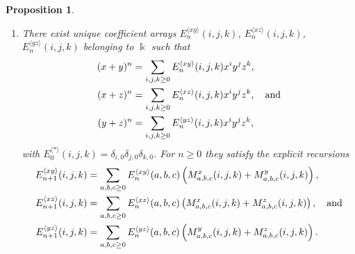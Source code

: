 \documentclass{amsart}
\newtheorem{proposition}[theorem]{Proposition}
\theoremstyle{definition}
\theoremstyle{remark}
\numberwithin{equation}{section}
\begin{document}
\begin{proposition}
\begin{enumerate}
\item [\rm (5)] There exist unique coefficient arrays $E^{\langle xy\rangle}_{n}(i,j,k)$, $E^{\langle xz\rangle}_{n}(i,j,k)$, $E^{\langle yz\rangle}_{n}(i,j,k)$ belonging to $\Bbbk$ such that
\begin{align}
(x+y)^n&=\sum_{i,j,k\ge 0}E^{\langle xy\rangle}_{n}(i,j,k) x^i y^j z^k,\label{Exydefcase5i}\\
(x+z)^n&=\sum_{i,j,k\ge 0}E^{\langle xz\rangle}_{n}(i,j,k) x^i y^j z^k,\label{Exzdefcase5i} \quad {\rm and} \\
(y+z)^n&=\sum_{i,j,k\ge 0}E^{\langle yz\rangle}_{n}(i,j,k) x^i y^j z^k,\label{Eyzdefcase5i}
\end{align}
with $E^{\langle\ast\rangle}_{0}(i,j,k)=\delta_{i,0}\delta_{j,0}\delta_{k,0}$. For $n\ge 0$ they satisfy the explicit recursions
\begin{equation}\label{Ereccase5i}
\begin{aligned}
E^{\langle xy\rangle}_{n+1}(i,j,k)
&=\sum_{a,b,c\ge 0}E^{\langle xy\rangle}_{n}(a,b,c)\left(M^x_{a,b,c}(i,j,k)+M^y_{a,b,c}(i,j,k)\right),\\
E^{\langle xz\rangle}_{n+1}(i,j,k)
&=\sum_{a,b,c\ge 0}E^{\langle xz\rangle}_{n}(a,b,c)\left(M^x_{a,b,c}(i,j,k)+M^z_{a,b,c}(i,j,k)\right), \quad {\rm and} \\
E^{\langle yz\rangle}_{n+1}(i,j,k)
&=\sum_{a,b,c\ge 0}E^{\langle yz\rangle}_{n}(a,b,c)\left(M^y_{a,b,c}(i,j,k)+M^z_{a,b,c}(i,j,k)\right).
\end{aligned}
\end{equation}
\end{enumerate}
\end{proposition}
\end{document}
